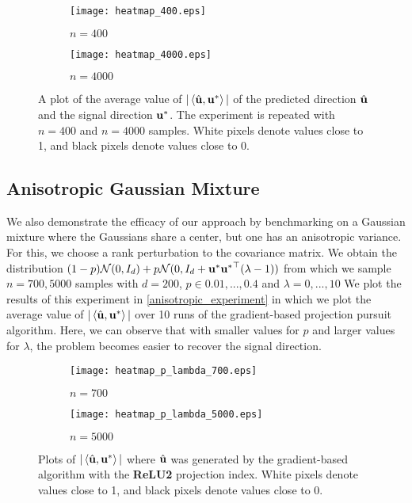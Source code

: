 \begin{figure}
    \centering
        \begin{subfigure}[b]{0.4\textwidth}
            \centering
            \texttt{[image: heatmap\_400.eps]}
            \caption{$n = 400$}
        \end{subfigure}
        \begin{subfigure}[b]{0.4\textwidth}
            \centering
            \texttt{[image: heatmap\_4000.eps]}
            \caption{$n = 4000$}
        \end{subfigure}
    \caption{
        A plot of the average value of $|\left\langle \hat{\mathbf{u}}, \mathbf{u}^* \right\rangle|$ of the predicted direction $\hat{\mathbf{u}}$ and the signal direction $\mathbf{u}^*$.
        The experiment is repeated with $n = 400$ and $n = 4000$ samples.
        White pixels denote values close to 1, and black pixels denote values close to 0.
    }
    \label{cabana_experiment}
\end{figure}

\subsection{Anisotropic Gaussian Mixture}
We also demonstrate the efficacy of our approach by benchmarking on a Gaussian mixture where the Gaussians share a center, but one has an anisotropic variance.
For this, we choose a rank perturbation to the covariance matrix.
We obtain the distribution $(1-p) \mathcal{N}(0, I_d) + p \mathcal{N}(0, I_d + \mathbf{u}^* {\mathbf{u}^*}^\top (\lambda - 1))$ from which we sample $n = 700, 5000$ samples with $d = 200$, $p \in {0.01, ..., 0.4}$ and $\lambda = {0, ..., 10}$
We plot the results of this experiment in \autoref{anisotropic_experiment} in which we plot the average value of $|\left\langle \hat{\mathbf{u}}, \mathbf{u}^* \right\rangle|$ over 10 runs of the gradient-based projection pursuit algorithm.
Here, we can observe that with smaller values for $p$ and larger values for $\lambda$, the problem becomes easier to recover the signal direction.

\begin{figure}[H]
    \centering
        \begin{subfigure}[b]{0.4\textwidth}
            \centering
            \texttt{[image: heatmap\_p\_lambda\_700.eps]}
            \caption{$n = 700$}
        \end{subfigure}
        \begin{subfigure}[b]{0.4\textwidth}
            \centering
            \texttt{[image: heatmap\_p\_lambda\_5000.eps]}
            \caption{$n = 5000$}
        \end{subfigure}
    \caption{
        Plots of $|\left\langle \hat{\mathbf{u}}, \mathbf{u}^* \right\rangle|$ where $\hat{\mathbf{u}}$ was generated by the gradient-based algorithm with the \textbf{ReLU2} projection index. 
        White pixels denote values close to 1, and black pixels denote values close to 0.
    }
    \label{anisotropic_experiment}
\end{figure}

